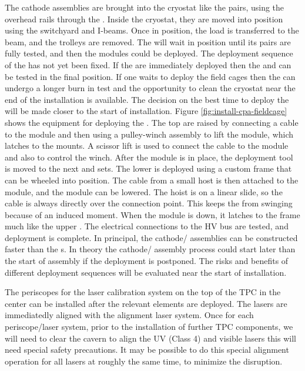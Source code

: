 The cathode  assemblies are brought into the cryostat like the  pairs, using the overhead rails through the . Inside the cryostat, they are moved into position using the  switchyard and  I-beams. 
Once in position, the load is transferred to the  beam, and the trolleys are removed. 
The  will wait in position until its  pairs are fully tested, and then the  modules could be deployed. 
The deployment sequence of the  has not yet been fixed. 
If the  are immediately deployed then the  and  can be tested in the final position. 
If one waits to deploy the field cages then the  can undergo a longer burn in test and the opportunity to clean the cryostat near the end of the installation is available. The decision on the best time to deploy the  will be made closer to the start of installation.
Figure \ref{fig:install-cpa-fieldcage} shows the equipment for deploying the . 
The top  are raised by connecting a cable to the module and then using a pulley-winch assembly to lift the module, which latches to the  mounts. 
A scissor lift is used to connect the cable to the module and also to control the winch. 
After the module is in place, the deployment tool is moved to the next and  sets. 
The lower  is deployed using a custom frame that can be wheeled into position. 
The cable from a small host is then attached to the  module, and the module can be lowered. 
The hoist is on a linear slide, so the cable is always directly over the connection point. 
This keeps the  from swinging because of an induced moment. 
When the module is down, it latches to the  frame much like the upper . 
The electrical connections to the HV bus are tested, and deployment is complete. 
In principal, the cathode/ assemblies can be constructed faster than the s. 
In theory the cathode/ assembly process could start later than the start of  assembly if the deployment is postponed. 
 The risks and benefits of different deployment sequences will be evaluated near the start of installation.

The periscopes for the laser calibration system on the top of the TPC in the center can be installed after the relevant  elements are deployed. The lasers are immediatedly aligned with the alignment laser system. 
Once for each periscope/laser system, prior to the installation of further TPC components, we will need to clear the cavern to align the UV (Class 4) and visible lasers this will need special safety precautions. 
It may be possible to do this special alignment operation for all lasers at roughly the same time, to minimize the disruption.

